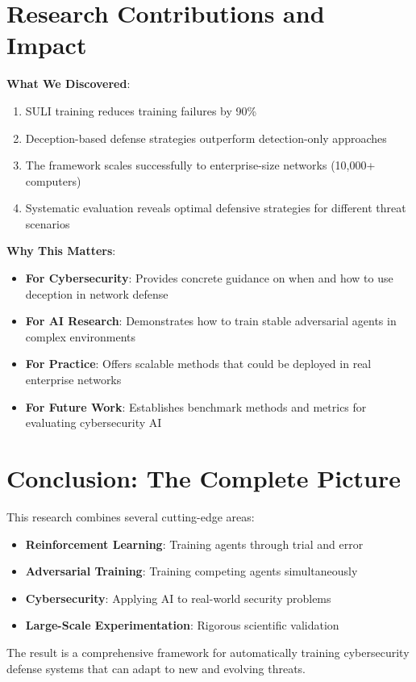 \documentclass[11pt]{article}
\begin{document}
\section{Research Contributions and Impact}

\begin{foundation}
\textbf{What We Discovered}:
\begin{enumerate}
\item SULI training reduces training failures by 90\%
\item Deception-based defense strategies outperform detection-only approaches
\item The framework scales successfully to enterprise-size networks (10,000+ computers)
\item Systematic evaluation reveals optimal defensive strategies for different threat scenarios
\end{enumerate}
\end{foundation}

\begin{intuition}
\textbf{Why This Matters}:
\begin{itemize}
\item \textbf{For Cybersecurity}: Provides concrete guidance on when and how to use deception in network defense
\item \textbf{For AI Research}: Demonstrates how to train stable adversarial agents in complex environments
\item \textbf{For Practice}: Offers scalable methods that could be deployed in real enterprise networks
\item \textbf{For Future Work}: Establishes benchmark methods and metrics for evaluating cybersecurity AI
\end{itemize}
\end{intuition}

\section{Conclusion: The Complete Picture}

\begin{foundation}
This research combines several cutting-edge areas:
\begin{itemize}
\item \textbf{Reinforcement Learning}: Training agents through trial and error
\item \textbf{Adversarial Training}: Training competing agents simultaneously  
\item \textbf{Cybersecurity}: Applying AI to real-world security problems
\item \textbf{Large-Scale Experimentation}: Rigorous scientific validation
\end{itemize}

The result is a comprehensive framework for automatically training cybersecurity defense systems that can adapt to new and evolving threats.
\end{foundation}
\end{document}
